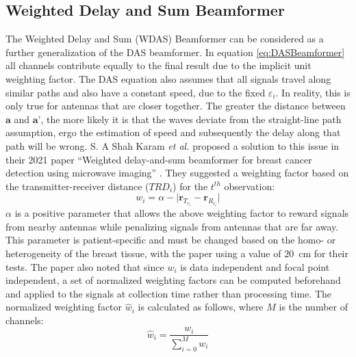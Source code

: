 \subsection{Weighted Delay and Sum Beamformer}
The Weighted Delay and Sum (WDAS) Beamformer can be considered as a further generalization of the DAS beamformer. In
equation \ref{eq:DASBeamformer} all channels contribute equally to the final result due to the implicit unit weighting
factor. The DAS equation also assumes that all signals travel along similar paths and also have a constant speed, due to
the fixed $\varepsilon_i$. In reality, this is only true for antennas that are closer together. The greater the distance
between $\textbf{a}$ and $\textbf{a'}$, the more likely it is that the waves deviate from the straight-line path
assumption, ergo the estimation of speed and subsequently the delay along that path will be wrong. S. A Shah Karam \textit{et
al.} proposed a solution to this issue in their 2021 paper ``Weighted delay-and-sum beamformer for breast cancer
detection using microwave imaging'' \cite{shahkaramWeightedDelayandsumBeamformer2021}. They suggested a weighting factor
based on the transmitter-receiver distance ($TRD_i$) for the $t^{th}$ observation:
\begingroup
\large
\begin{equation}
    w_i = \alpha -  \lvert \textbf{r}_{T_{r_i}} - \textbf{r}_{R_{c_i}} \rvert
\end{equation}
\endgroup
$\alpha$ is a positive parameter that allows the above weighting factor to reward signals from nearby antennas while
penalizing signals from antennas that are far away. This parameter is patient-specific and must be changed based on the
homo- or heterogeneity of the breast tissue, with the paper using a value of $20$~cm for their tests. The paper also
noted that since $w_i$ is data independent and focal point independent, a set of normalized weighting factors can be
computed beforehand and applied to the signals at collection time rather than processing time. The normalized weighting
factor $\hat{w}_i$ is calculated as follows, where $M$ is the number of channels:
\begingroup
\large
\begin{equation}
    \hat{w}_i = \frac{w_i}{\sum_{i=0}^{M} w_i}
\end{equation} 
\endgroup
